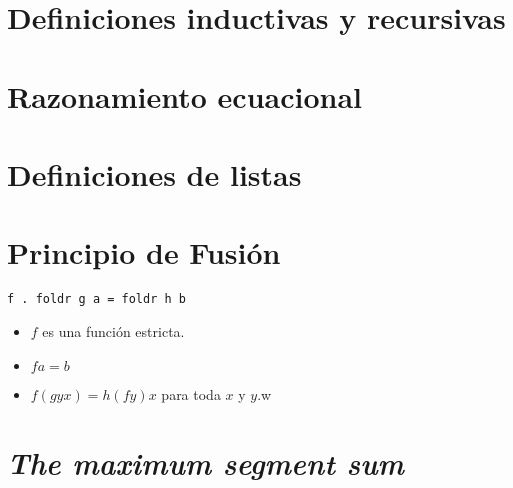 \section{Definiciones inductivas y recursivas}

\section{Razonamiento ecuacional}


\section{Definiciones de listas}

\section{Principio de Fusión}
\begin{verbatim}
f . foldr g a = foldr h b
\end{verbatim}

\begin{itemize}
    \item $f$ es una función estricta.
    \item $f a = b$
    \item $f(g y x) = h (f y) x$ para toda $x$ y $y$.w
\end{itemize}

\section{\textit{The maximum segment sum}}
